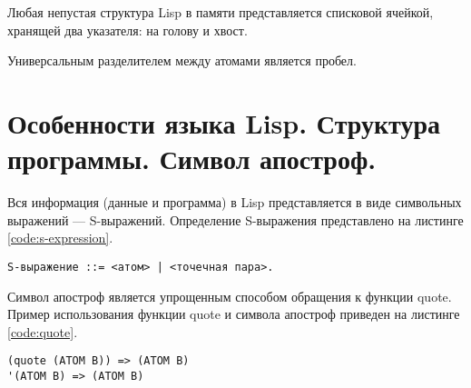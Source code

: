 Любая непустая структура Lisp в памяти представляется списковой ячейкой, хранящей два указателя: на голову и хвост.

Универсальным разделителем между атомами является пробел.

\section{Особенности языка Lisp. Структура программы. Символ апостроф.}
Вся информация (данные и программа) в Lisp представляется в виде символьных выражений --- S-выражений. Определение S-выражения представлено на листинге \ref{code:s-expression}.

\begin{lstlisting}[label=code:s-expression, caption = Определение S-выражения.]
S-выражение ::= <атом> | <точечная пара>.
\end{lstlisting}

Символ апостроф является упрощенным способом обращения к функции quote. Пример использования функции quote и символа апостроф приведен на листинге \ref{code:quote}.
\newpage

\begin{lstlisting}[label=code:quote, caption = Пример использования функции quote и символа апостроф.]
(quote (ATOM B)) => (ATOM B)
'(ATOM B) => (ATOM B)
\end{lstlisting}


